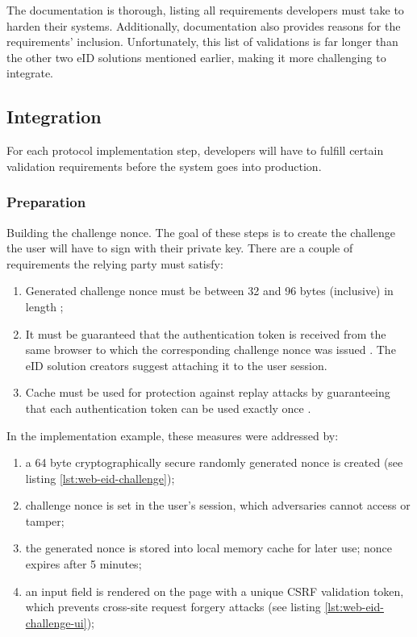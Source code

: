 The documentation is thorough, listing all requirements developers must take to harden their systems. Additionally, documentation also provides reasons for the requirements' inclusion. Unfortunately, this list of validations is far longer than the other two eID solutions mentioned earlier, making it more challenging to integrate.

\subsection{Integration}

For each protocol implementation step, developers will have to fulfill certain validation requirements before the system goes into production.

\subsubsection{Preparation}

Building the challenge nonce. The goal of these steps is to create the challenge the user will have to sign with their private key. There are a couple of requirements the relying party must satisfy:
\begin{enumerate}
  \item Generated challenge nonce must be between 32 and 96 bytes (inclusive) in length \cite{ria-webeid-source-web-eid-app-authenticate};
  \item It must be guaranteed that the authentication token is received from the same browser to which the corresponding challenge nonce was issued \cite{ria-webeid-source-web-eid-authtoken-validation-java-readme}. The eID solution creators suggest attaching it to the user session.
  \item Cache must be used for protection against replay attacks by guaranteeing that each authentication token can be used exactly once \cite{ria-webeid-source-web-eid-authtoken-validation-java-readme}.
\end{enumerate}

In the implementation example, these measures were addressed by:
\begin{enumerate}
  \item a 64 byte cryptographically secure randomly generated nonce is created (see listing \ref{lst:web-eid-challenge});
  \item challenge nonce is set in the user's session, which adversaries cannot access or tamper;
  \item the generated nonce is stored into local memory cache for later use; nonce expires after 5 minutes;
  \item an input field is rendered on the page with a unique CSRF validation token, which prevents cross-site request forgery attacks (see listing \ref{lst:web-eid-challenge-ui});
\end{enumerate}

